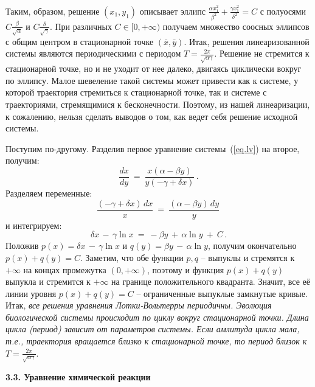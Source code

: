 \documentclass[12pt,a4paper]{article}
\begin{document}
Таким, образом, решение $(x_1, y_1)$ описывает эллипс $\frac{\alpha x_1^2}{\beta^2} + \frac{\gamma x_1^2}{\delta^2} = C$
с полуосями $C\frac{\beta}{\sqrt{\alpha}}$ и $C\frac{\delta}{\sqrt{\gamma}}$.
При различных $C \in [0, +\infty)$ получаем множество соосных эллипсов с общим центром в стационарной
точке $(\bar x, \bar y)$. Итак, решения линеаризованной системы являются периодическими с периодом
$T = \frac{2\pi}{\sqrt{\alpha \gamma}}$. Решение не стремится к стационарной точке, но и не уходит от нее далеко,
двигаясь циклически вокруг по эллипсу. Малое шевеление такой системы может привести как к системе, у которой траектория  стремиться к стационарной точке, так и системе с траекториями, стремящимися к бесконечности. Поэтому, из нашей линеаризации, к сожалению, нельзя сделать выводов о том, как ведет себя решение
исходной системы.

Поступим по-другому. Разделив первое уравнение системы~(\ref{eq.lv}) на второе, получим:
$$
\frac{d x}{d y}\ =  \  \frac{x (\alpha - \beta y)}{y (-\gamma + \delta x)}\, .
$$
Разделяем переменные:
$$
\frac{(-\gamma + \delta x)\, d x}{x}\ =  \  \frac{ (\alpha - \beta y)\, d y}{y}\,
$$
и интегрируем:
$$
\delta x \, - \,  \gamma \ln x \ = \ - \beta y \, +\, \alpha \ln y \ + \ C\, .
$$
Положив $p(x) = \delta x \, - \,  \gamma \ln x$ и $q(y) = \beta y \, -\, \alpha \ln y$,
получим окончательно $p(x) + q(y) = C$. Заметим, что обе функции $p, q$ -- выпуклы и стремятся к $+\infty$ на концах
промежутка $(0, +\infty)$, поэтому и
функция $p(x) + q(y)$ выпукла и стремится к $+\infty$ на границе положительного квадранта. Значит, все её линии уровня
 $p(x) + q(y) = C$ -- ограниченные выпуклые замкнутые кривые. Итак, {\em все решения уравнения Лотки-Вольтерры периодичны. Эволюция биологической системы происходит по циклу вокруг стационарной точки. Длина цикла (период) зависит от
 параметров системы. Если амлитуда цикла мала, т.е., траектория вращается близко к стационарной точке,
 то период близок к $T = \frac{2\pi}{\sqrt{\alpha \gamma}}$}.

\bigskip

\begin{center}
\textbf{3.3. Уравнение химической реакции}
\end{center}
\smallskip
\end{document}
